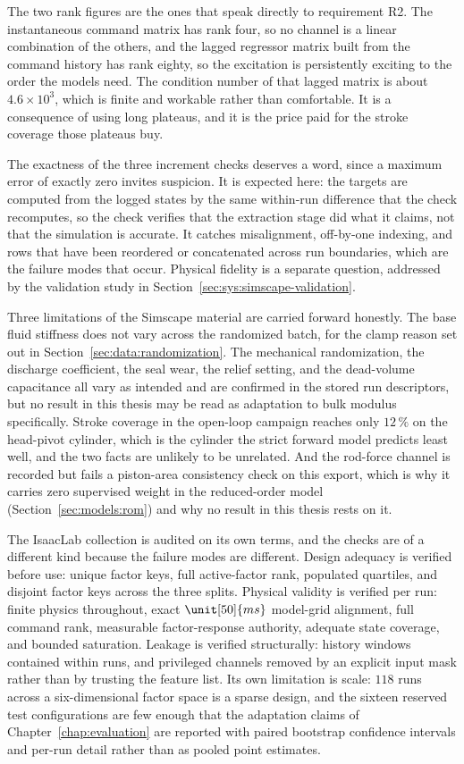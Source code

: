 The two rank figures are the ones that speak directly to requirement R2.
The instantaneous command matrix has rank four, so no channel is a
linear combination of the others, and the lagged regressor matrix built
from the command history has rank eighty, so the excitation is
persistently exciting to the order the models need. The condition number
of that lagged matrix is about $4.6\times10^{3}$, which is finite and
workable rather than comfortable. It is a consequence of using long
plateaus, and it is the price paid for the stroke coverage those
plateaus buy.

The exactness of the three increment checks deserves a word, since a
maximum error of exactly zero invites suspicion. It is expected here:
the targets are computed from the logged states by the same within-run
difference that the check recomputes, so the check verifies that the
extraction stage did what it claims, not that the simulation is
accurate. It catches misalignment, off-by-one indexing, and rows that
have been reordered or concatenated across run boundaries, which are the failure modes that occur. Physical fidelity is a separate
question, addressed by the validation study in
Section~\ref{sec:sys:simscape-validation}.

Three limitations of the Simscape material are carried forward honestly.
The base fluid stiffness does not vary across the randomized batch, for
the clamp reason set out in Section~\ref{sec:data:randomization}. The
mechanical randomization, the discharge coefficient, the seal wear, the
relief setting, and the dead-volume capacitance all vary as intended and
are confirmed in the stored run descriptors, but no result in this
thesis may be read as adaptation to bulk modulus specifically. Stroke
coverage in the open-loop campaign reaches only $12\,\%$ on the
head-pivot cylinder, which is the cylinder the strict forward model
predicts least well, and the two facts are unlikely to be unrelated. And
the rod-force channel is recorded but fails a piston-area consistency
check on this export, which is why it carries zero supervised weight in
the reduced-order model (Section~\ref{sec:models:rom}) and why no result
in this thesis rests on it.

The IsaacLab collection is audited on its own terms, and the checks are
of a different kind because the failure modes are different. Design
adequacy is verified before use: unique factor keys, full active-factor
rank, populated quartiles, and disjoint factor keys across the three
splits. Physical validity is verified per run: finite physics
throughout, exact $\unit[50]{ms}$ model-grid alignment, full command
rank, measurable factor-response authority, adequate state coverage, and
bounded saturation. Leakage is verified structurally: history windows
contained within runs, and privileged channels removed by an explicit
input mask rather than by trusting the feature list. Its own limitation is scale: $118$ runs across a six-dimensional factor space is a sparse
design, and the sixteen reserved test configurations are few enough that
the adaptation claims of Chapter~\ref{chap:evaluation} are reported with
paired bootstrap confidence intervals and per-run detail rather than as
pooled point estimates.

